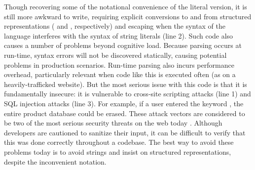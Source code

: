 Though recovering some of the notational convenience of the literal version, it is still more awkward to write, requiring explicit conversions to and from structured representations ( and , respectively) and escaping when the syntax of the language interferes with the syntax of string literals (line 2). Such code also causes a number of problems beyond cognitive load. Because parsing occurs at run-time, syntax errors will not be discovered statically, causing potential problems in production scenarios. Run-time parsing also incurs performance overhead, particularly relevant when code like this is executed often (as on a heavily-trafficked website). But the most serious issue with this code is that it is fundamentally insecure: it is vulnerable to cross-site scripting attacks (line 1) and SQL injection attacks (line 3). For example, if a user entered the keyword , the entire product database could be erased. These attack vectors are considered to be two of the most serious security threats on the web today \cite{owasp2013}. Although developers are cautioned to sanitize their input, it can be difficult to verify that this was done correctly throughout a codebase. The best way to avoid these problems today is to avoid strings and insist on structured representations, despite the inconvenient notation.

